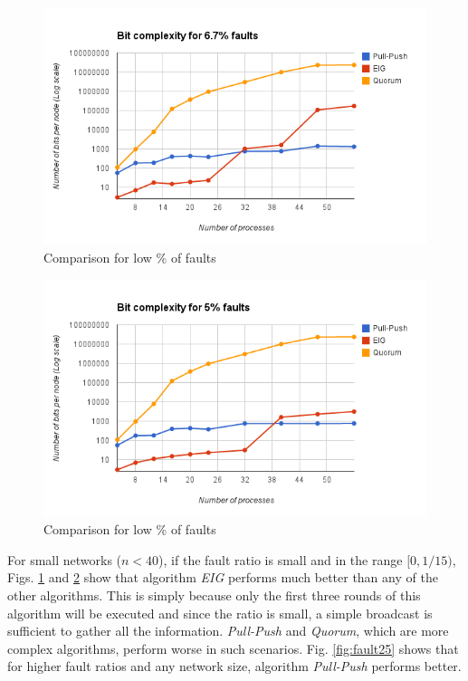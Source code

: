 \begin{figure}[ht]
 \centering
\includegraphics[scale=0.4]{Fault667}
\caption{Comparison for low \% of faults}
 \label{fig:fault667}
\vspace{-2mm}
\end{figure}

\begin{figure}[ht]
 \centering
\includegraphics[scale=0.4]{Fault5}
\caption{Comparison for low \% of faults}
 \label{fig:fault5}
\vspace{-2mm}
\end{figure}

For small networks ($n < 40$), if the fault ratio is small and in the range $[0, 1/15)$, Figs. \ref{fig:fault667} and \ref{fig:fault5} show that algorithm \textit{EIG} performs much better than any of the other algorithms. This is simply because only the first three rounds of this algorithm will be executed and since the ratio is small, a simple broadcast is sufficient to gather all the information. \textit{Pull-Push} and \textit{Quorum}, which are more complex algorithms, perform worse in such scenarios. Fig. \ref{fig:fault25} shows that for higher fault ratios and any network size, algorithm \textit{Pull-Push} performs better.

